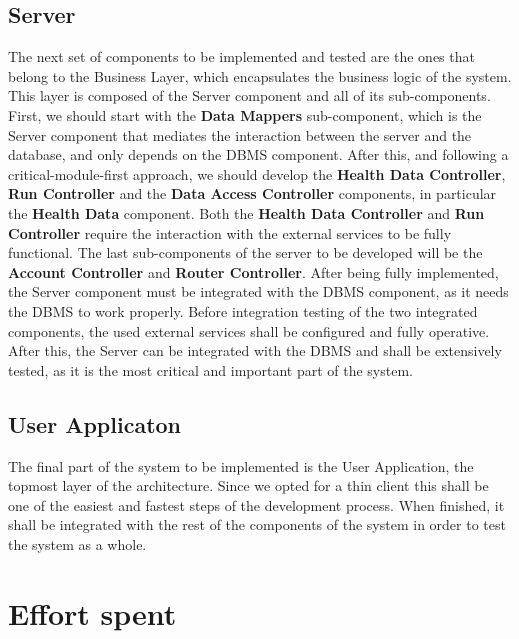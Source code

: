 \documentclass[12pt]{article}
\begin{document}
\subsection{Server}
The next set of components to be implemented and tested are the ones that belong to the Business Layer, which encapsulates the business logic of the system. This layer is composed of the Server component and all of its sub-components.
\newline \noindent First, we should start with the \textbf{Data Mappers} sub-component, which is the Server component that mediates the interaction between the server and the database, and only depends on the DBMS component.
\newline \noindent After this, and following a critical-module-first approach, we should develop the \textbf{Health Data Controller}, \textbf{Run Controller} and the \textbf{Data Access Controller} components, in particular the \textbf{Health Data} component. Both the \textbf{Health Data Controller} and \textbf{Run Controller} require the interaction with the external services to be fully functional. The last sub-components of the server to be developed will be the \textbf{Account Controller} and \textbf{Router Controller}. 
\newline \noindent After being fully implemented, the Server component must be integrated with
the DBMS component, as it needs the DBMS to work properly.
\newline \noindent Before integration testing of the two integrated components, the used external
services shall be configured and fully operative. After this, the Server can be integrated with the DBMS and shall be extensively tested, as it is the most critical and important part of the system. 
\subsection{User Applicaton}The final part of the system to be implemented is the User Application, the topmost
layer of the architecture. Since we opted for a thin client this shall be one of the
easiest and fastest steps of the development process. When finished, it shall be
integrated with the rest of the components of the system in order to test the system
as a whole.





\section{Effort spent}
\end{document}
